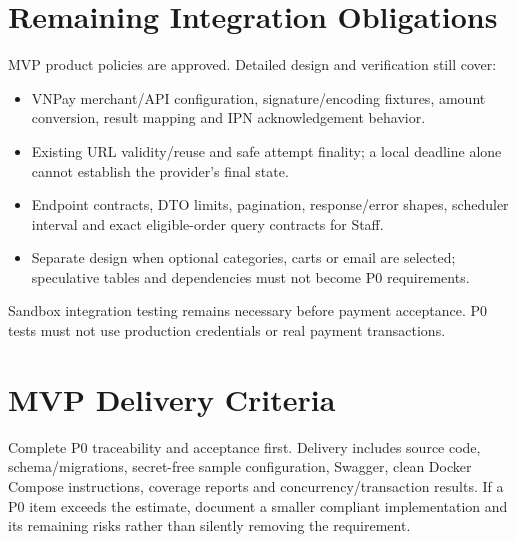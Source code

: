 \section{Remaining Integration Obligations}
MVP product policies are approved. Detailed design and verification still cover:
\begin{itemize}
\item VNPay merchant/API configuration, signature/encoding fixtures, amount conversion, result mapping and IPN acknowledgement behavior.
\item Existing URL validity/reuse and safe attempt finality; a local deadline alone cannot establish the provider's final state.
\item Endpoint contracts, DTO limits, pagination, response/error shapes, scheduler interval and exact eligible-order query contracts for Staff.
\item Separate design when optional categories, carts or email are selected; speculative tables and dependencies must not become P0 requirements.
\end{itemize}

Sandbox integration testing remains necessary before payment acceptance. P0 tests must not use production credentials or real payment transactions.

\section{MVP Delivery Criteria}
Complete P0 traceability and acceptance first. Delivery includes source code, schema/migrations, secret-free sample configuration, Swagger, clean Docker Compose instructions, coverage reports and concurrency/transaction results. If a P0 item exceeds the estimate, document a smaller compliant implementation and its remaining risks rather than silently removing the requirement.

